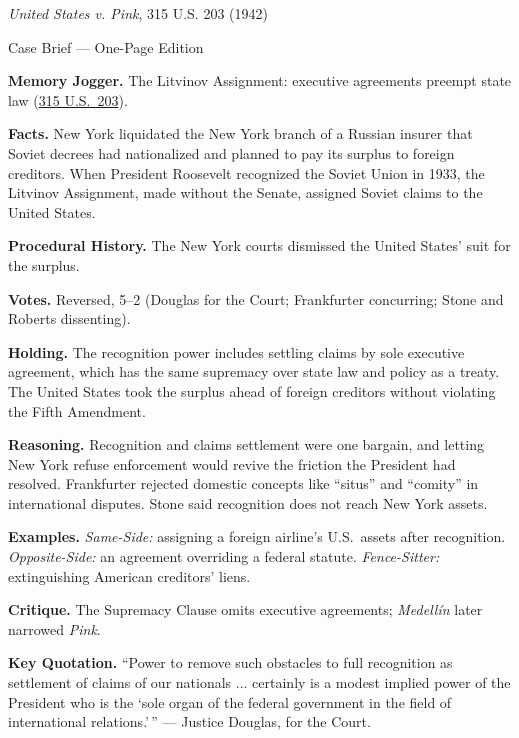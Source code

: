 \documentclass[12pt]{article}
\begin{document}
\begin{center}
{\Large \textit{United States v. Pink}, 315 U.S. 203 (1942)\par}
\vspace{0.3em}
{\normalsize Case Brief --- One-Page Edition\par}
\end{center}

\textbf{Memory Jogger.} The Litvinov Assignment: executive agreements preempt state law (\href{https://supreme.justia.com/cases/federal/us/315/203/}{315 U.S.\ 203}).

\textbf{Facts.} New York liquidated the New York branch of a Russian insurer that Soviet decrees had nationalized and planned to pay its surplus to foreign creditors. When President Roosevelt recognized the Soviet Union in 1933, the Litvinov Assignment, made without the Senate, assigned Soviet claims to the United States.

\textbf{Procedural History.} The New York courts dismissed the United States' suit for the surplus.

\textbf{Votes.} Reversed, 5--2 (Douglas for the Court; Frankfurter concurring; Stone and Roberts dissenting).

\textbf{Holding.} The recognition power includes settling claims by sole executive agreement, which has the same supremacy over state law and policy as a treaty. The United States took the surplus ahead of foreign creditors without violating the Fifth Amendment.

\textbf{Reasoning.} Recognition and claims settlement were one bargain, and letting New York refuse enforcement would revive the friction the President had resolved. Frankfurter rejected domestic concepts like ``situs'' and ``comity'' in international disputes. Stone said recognition does not reach New York assets.

\textbf{Examples.} \emph{Same-Side:} assigning a foreign airline's U.S.\ assets after recognition. \emph{Opposite-Side:} an agreement overriding a federal statute. \emph{Fence-Sitter:} extinguishing American creditors' liens.

\textbf{Critique.} The Supremacy Clause omits executive agreements; \textit{Medell\'in} later narrowed \textit{Pink}.

\textbf{Key Quotation.} ``Power to remove such obstacles to full recognition as settlement of claims of our nationals ... certainly is a modest implied power of the President who is the `sole organ of the federal government in the field of international relations.'\,'' --- Justice Douglas, for the Court.
\end{document}
